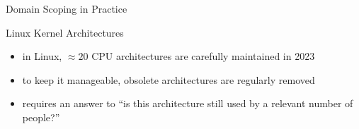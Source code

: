 \begin{frame}{Domain Scoping in Practice}
	\begin{fancycolumns}[widths={70},animation=none]
		\centering{}
	\nextcolumn
		\begin{example}{Linux Kernel Architectures}
			\begin{itemize}
				\item in Linux, $\approx 20$ CPU architectures are carefully maintained in 2023
				\item to keep it manageable, obsolete architectures are regularly removed
				\item requires an answer to ``is this architecture still used by a relevant number of people?''
			\end{itemize}
		\end{example}
	\end{fancycolumns}
\end{frame}

